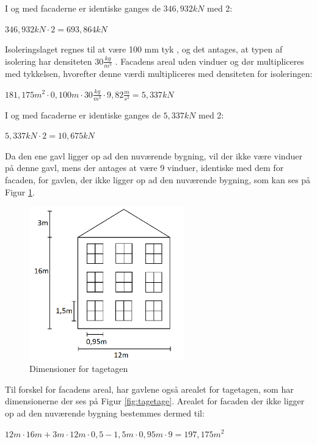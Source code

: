 I og med facaderne er identiske ganges de $346,\!932 kN$ med 2:
\begin{center}
	$346,\!932 kN\cdot 2=693,\!864 kN$
\end{center}

Isoleringslaget regnes til at være 100 mm tyk \citep{isolering}, og det antages, at typen af isolering har densiteten $30 \frac{kg}{m^3}$ \citep{densitet}.
\newline \indent{     }  Facadens areal uden vinduer og dør multipliceres med tykkelsen, hvorefter denne værdi multipliceres med densiteten for isoleringen:
\begin{center}
	$181,\!175 m^2\cdot 0,\!100 m \cdot 30 \frac{kg}{m^3}\cdot 9,\!82 \frac{m}{s^2}=5,\!337 kN$
\end{center}

I og med facaderne er identiske ganges de $5,\!337 kN$ med 2:
\begin{center}
	$5,\!337 kN\cdot 2=10,\!675 kN$
\end{center}

Da den ene gavl ligger op ad den nuværende bygning, vil der ikke være vinduer på denne gavl, mens der antages at være 9 vinduer, identiske med dem for facaden, for gavlen, der ikke ligger op ad den nuværende bygning, som kan ses på Figur \ref{fig:gavl}.

\begin{figure}[htbp]
	\centering
	\includegraphics[width=0.6\textwidth]{billeder/facadevestellerost.png}
	\caption{Dimensioner for tagetagen}
	\label{fig:gavl}
\end{figure}

Til forskel for facadens areal, har gavlene også arealet for tagetagen, som har dimensionerne der ses på Figur \ref{fig:tagetage}. Arealet for facaden der ikke ligger op ad den nuværende bygning bestemmes dermed til:
\begin{center}
	$12 m\cdot 16 m + 3 m\cdot 12 m \cdot 0,\!5 - 1,\!5 m\cdot 0,\!95 m \cdot 9=197,\!175 m^2$
\end{center}

